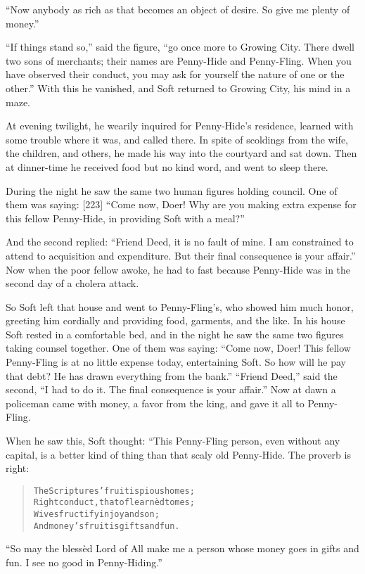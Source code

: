 \documentclass[article, twoside, 14pt]{memoir}
\renewenvironment{verbatim}{%
\begin{quote}%
\vskip -10pt%
\begin{alltt}\normalfont\large}{\end{alltt}%
\end{quote}%
\vskip -10pt
} %
\begin{document}
``Now anybody as rich as that becomes an object of desire. So give me plenty of money.''

``If things stand so,'' said the figure,
``go once more to Growing City. There dwell two sons of merchants; their names are Penny-Hide and Penny-Fling. When you have observed their conduct, you may ask for yourself the nature of one or the other.''
With this he vanished, and Soft returned to Growing City, his mind
in a maze.

At evening twilight, he wearily inquired for Penny-Hide's
residence, learned with some trouble where it was, and called
there. In spite of scoldings from the wife, the children, and
others, he made his way into the courtyard and sat down. Then at
dinner-time he received food but no kind word, and went to sleep
there.

During the night he saw the same two human figures holding council.
One of them was saying: [223]
``Come now, Doer! Why are you making extra expense for this fellow Penny-Hide, in providing Soft with a meal?''

And the second replied:
``Friend Deed, it is no fault of mine. I am constrained to attend to acquisition and expenditure. But their final consequence is your affair.''
Now when the poor fellow awoke, he had to fast because Penny-Hide
was in the second day of a cholera attack.

So Soft left that house and went to Penny-Fling's, who showed him
much honor, greeting him cordially and providing food, garments,
and the like. In his house Soft rested in a comfortable bed, and in
the night he saw the same two figures taking counsel together. One
of them was saying:
``Come now, Doer! This fellow Penny-Fling is at no little expense today, entertaining Soft. So how will he pay that debt? He has drawn everything from the bank.''
``Friend Deed,'' said the second,
``I had to do it. The final consequence is your affair.'' Now at
dawn a policeman came with money, a favor from the king, and gave
it all to Penny-Fling.

When he saw this, Soft thought: “This Penny-Fling person, even
without any capital, is a better kind of thing than that scaly old
Penny-Hide. The proverb is right:

\begin{verbatim}
The Scriptures' fruit is pious homes;
Right conduct, that of learnèd tomes;
Wives fructify in joy and son;
And money's fruit is gifts and fun.
\end{verbatim}
``So may the blessèd Lord of All make me a person whose money goes in gifts and fun. I see no good in Penny-Hiding.''
\end{document}
